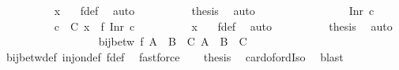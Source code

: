 \begin{isabellebody}
\ \ \ \ \ \ \ \ \isamarkupfalse%
\ x\ {}\ \isamarkupfalse%
\ f{\isacharunderscore}{\kern0pt}def\ \isamarkupfalse%
\ auto\isanewline
\ \ \ \ \ \ \ \ \isamarkupfalse%
\ {\isacharquery}{\kern0pt}thesis\ \isamarkupfalse%
\ auto\isanewline
\ \ \ \ \ \ \isamarkupfalse%
\isanewline
\ \ \ \ \ \ \ \ \isamarkupfalse%
\ {\isacharparenleft}{\kern0pt}Inr\ c{\isacharparenright}{\kern0pt}\isanewline
\ \ \ \ \ \ \ \ \isamarkupfalse%
\ {\isachardoublequoteopen}c\ {\isasymin}\ C{\isachardoublequoteclose}\ {\isachardoublequoteopen}x\ {\isacharequal}{\kern0pt}\ f\ {\isacharparenleft}{\kern0pt}Inr\ c{\isacharparenright}{\kern0pt}{\isachardoublequoteclose}\isanewline
\ \ \ \ \ \ \ \ \isamarkupfalse%
\ x\ {}\ \isamarkupfalse%
\ f{\isacharunderscore}{\kern0pt}def\ \isamarkupfalse%
\ auto\isanewline
\ \ \ \ \ \ \ \ \isamarkupfalse%
\ {\isacharquery}{\kern0pt}thesis\ \isamarkupfalse%
\ auto\isanewline
\ \ \ \ \ \ \isamarkupfalse%
\isanewline
\ \ \ \ \isamarkupfalse%
\isanewline
\ \ \isamarkupfalse%
\isanewline
\ \ \isamarkupfalse%
\ {\isachardoublequoteopen}bij{\isacharunderscore}{\kern0pt}betw\ f\ {\isacharparenleft}{\kern0pt}{\isacharparenleft}{\kern0pt}A\ {\isacharless}{\kern0pt}{\isacharplus}{\kern0pt}{\isachargreater}{\kern0pt}\ B{\isacharparenright}{\kern0pt}\ {\isacharless}{\kern0pt}{\isacharplus}{\kern0pt}{\isachargreater}{\kern0pt}\ C{\isacharparenright}{\kern0pt}\ {\isacharparenleft}{\kern0pt}A\ {\isacharless}{\kern0pt}{\isacharplus}{\kern0pt}{\isachargreater}{\kern0pt}\ B\ {\isacharless}{\kern0pt}{\isacharplus}{\kern0pt}{\isachargreater}{\kern0pt}\ C{\isacharparenright}{\kern0pt}{\isachardoublequoteclose}\isanewline
\ \ \ \ \isamarkupfalse%
\ bij{\isacharunderscore}{\kern0pt}betw{\isacharunderscore}{\kern0pt}def\ inj{\isacharunderscore}{\kern0pt}on{\isacharunderscore}{\kern0pt}def\ f{\isacharunderscore}{\kern0pt}def\ \isamarkupfalse%
\ fastforce\isanewline
\ \ \isamarkupfalse%
\ {\isacharquery}{\kern0pt}thesis\ \isamarkupfalse%
\ card{\isacharunderscore}{\kern0pt}of{\isacharunderscore}{\kern0pt}ordIso\ \isamarkupfalse%
\ blast\isanewline
{}\isamarkupfalse%
%
\endisatagproof
{\isafoldproof}%
%
\isadelimproof
\isanewline
%
\endisadelimproof
\isanewline
{}\isamarkupfalse%

\end{isabellebody}
